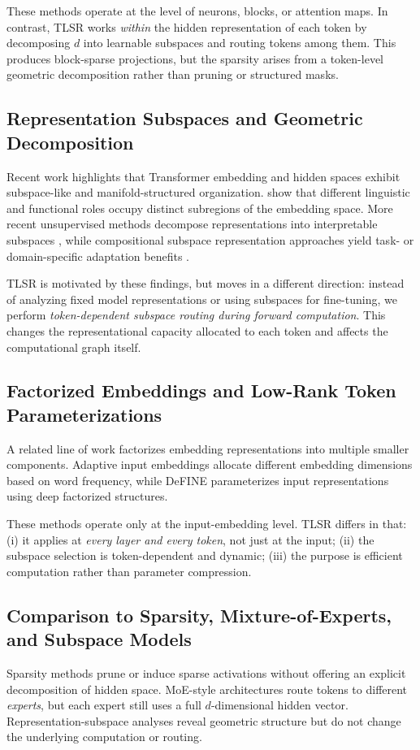\documentclass{article}
\theoremstyle{plain}
\theoremstyle{definition}
\theoremstyle{remark}
\begin{document}
These methods operate at the level of neurons, blocks, or attention maps.
In contrast, TLSR works \emph{within} the hidden representation of each token
by decomposing $d$ into learnable subspaces and routing tokens among them.
This produces block-sparse projections, but the sparsity arises from a
token-level geometric decomposition rather than pruning or structured masks.

\subsection{Representation Subspaces and Geometric Decomposition}
Recent work highlights that Transformer embedding and hidden spaces exhibit
subspace-like and manifold-structured organization.
\citet{mickus2022muppet} show that different linguistic and functional roles
occupy distinct subregions of the embedding space.
More recent unsupervised methods decompose representations into interpretable
subspaces \citep{huang2025ndm}, while compositional subspace
representation approaches yield task- or domain-specific adaptation benefits
\citep{csreft2025representation}.

TLSR is motivated by these findings, but moves in a different direction:
instead of analyzing fixed model representations or using subspaces for
fine-tuning, we perform \emph{token-dependent subspace routing during forward
computation}.
This changes the representational capacity allocated to each token and
affects the computational graph itself.

\subsection{Factorized Embeddings and Low-Rank Token Parameterizations}
A related line of work factorizes embedding representations into multiple
smaller components.
Adaptive input embeddings \citep{baevski2019adaptiveinput} allocate different
embedding dimensions based on word frequency, while DeFINE
\citep{mehta2020define} parameterizes input representations using deep
factorized structures.

These methods operate only at the input-embedding level.
TLSR differs in that:
(i) it applies at \emph{every layer and every token}, not just at the input;
(ii) the subspace selection is token-dependent and dynamic;
(iii) the purpose is efficient computation rather than parameter compression.

\subsection{Comparison to Sparsity, Mixture-of-Experts, and Subspace Models}
Sparsity methods \citep{fang2024maskllm,zheng2024readme,li2023lazyneuron}
prune or induce sparse activations without offering an explicit decomposition
of hidden space.
MoE-style architectures route tokens to different \emph{experts}, but each
expert still uses a full $d$-dimensional hidden vector.
Representation-subspace analyses
\citep{mickus2022muppet,huang2025ndm,csreft2025representation} reveal
geometric structure but do not change the underlying computation or routing.
\end{document}

